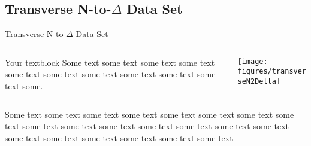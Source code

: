 \documentclass[xcolor=x11names,compress,8pt]{beamer}
\renewcommand{\(}{\begin{columns}}
\renewcommand{\)}{\end{columns}}
\newcommand{\<}[1]{\begin{column}{#1}}
\renewcommand{\>}{\end{column}}
\begin{document}
\subsection{Transverse N-to-$\Delta$ Data Set}
\begin{frame}{Transverse N-to-$\Delta$ Data Set}

\transglitter %

%

  \begin{columns}[T]
    \begin{column}{0.25\textwidth}
     \begin{block}{Your textblock}
	\pause
	Some text some text some text some text some text some text some text some text some text some text some.
    \end{block}
    \end{column}
    \begin{column}{0.8\textwidth}
    \begin{block}{}
	\texttt{[image: figures/transverseN2Delta]}
    \end{block}
    \end{column}
  \end{columns}

	\pause
Some text some text some text some text some text some text some text some text some text some text some text some text some text some text some text some text some text some text some text some text some text

\end{frame}
\end{document}
